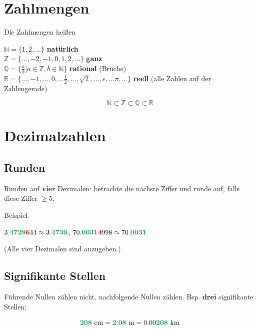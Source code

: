 \begin{multicols}{2}%

\section*{Zahlmengen}
\begin{definition*}{}{}
Die Zahlmengen heißen

$\mathbb{N} = \{1,2, ...\}$                                   \textbf{natürlich}\\
$\mathbb{Z} = \{..., -2, -1, 0, 1,2, ...\}$                   \textbf{ganz}\\
$\mathbb{Q} = \{\frac{a}b|a\in \mathbb{Z},b\in\mathbb{N}\}$   \textbf{rational} (Brüche)\\
$\mathbb{R} = \{..., -1, ..., 0, ... \frac12, ..., \sqrt{2}, ..., e, ... \pi, ...\}  $ \textbf{reell} (alle Zahlen auf der Zahlengerade)\\
\end{definition*}

$$\mathbb{N} \subset \mathbb{Z} \subset \mathbb{Q} \subset \mathbb{R}$$

\hrulefill%

\section*{Dezimalzahlen}
\subsection*{Runden}
Runden auf \textbf{\color{ForestGreen}vier}  Dezimalen: betrachte die nächste Ziffer und runde auf, falls diese {\color{red}Ziffer} $\ge 5$.

Beispiel

$3.\mathbf{\color{ForestGreen}4729}\mathbf{\color{red}6}44 \approx
3.\mathbf{\color{ForestGreen}4730}$; \hfill{ }
$70.\mathbf{\color{ForestGreen}0031}\mathbf{\color{red}4}998\approx
70.\mathbf{\color{ForestGreen}0031}$

(Alle vier Dezimalen sind anzugeben.)

\subsection*{Signifikante Stellen}
Führende Nullen zählen nicht, nachfolgende Nullen
zählen. Bsp. \textbf{\color{ForestGreen}drei} signifikante Stellen:

$$\mathbf{\color{ForestGreen}208} \textrm{ cm} = \mathbf{\color{ForestGreen}2.08} \textrm{ m} = 0.00\mathbf{\color{ForestGreen}208} \textrm{ km}$$


\end{multicols}
